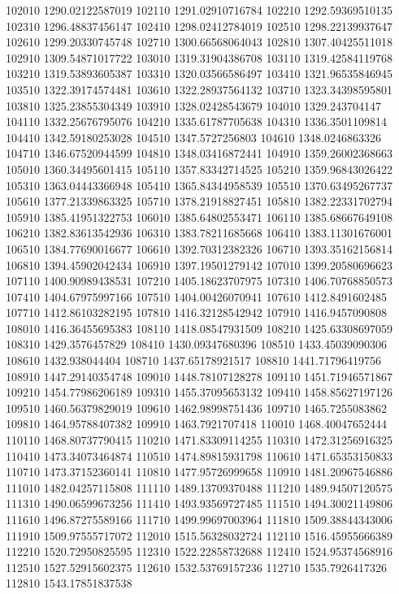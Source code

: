 {102010 1290.02122587019
102110 1291.02910716784
102210 1292.59369510135
102310 1296.48837456147
102410 1298.02412784019
102510 1298.22139937647
102610 1299.20330745748
102710 1300.66568064043
102810 1307.40425511018
102910 1309.54871017722
103010 1319.31904386708
103110 1319.42584119768
103210 1319.53893605387
103310 1320.03566586497
103410 1321.96535846945
103510 1322.39174574481
103610 1322.28937564132
103710 1323.34398595801
103810 1325.23855304349
103910 1328.02428543679
104010 1329.243704147
104110 1332.25676795076
104210 1335.61787705638
104310 1336.3501109814
104410 1342.59180253028
104510 1347.5727256803
104610 1348.0246863326
104710 1346.67520944599
104810 1348.03416872441
104910 1359.26002368663
105010 1360.34495601415
105110 1357.83342714525
105210 1359.96843026422
105310 1363.04443366948
105410 1365.84344958539
105510 1370.63495267737
105610 1377.21339863325
105710 1378.21918827451
105810 1382.22331702794
105910 1385.41951322753
106010 1385.64802553471
106110 1385.68667649108
106210 1382.83613542936
106310 1383.78211685668
106410 1383.11301676001
106510 1384.77690016677
106610 1392.70312382326
106710 1393.35162156814
106810 1394.45902042434
106910 1397.19501279142
107010 1399.20580696623
107110 1400.90989438531
107210 1405.18623707975
107310 1406.70768850573
107410 1404.67975997166
107510 1404.00426070941
107610 1412.8491602485
107710 1412.86103282195
107810 1416.32128542942
107910 1416.9457090808
108010 1416.36455695383
108110 1418.08547931509
108210 1425.63308697059
108310 1429.3576457829
108410 1430.09347680396
108510 1433.45039090306
108610 1432.938044404
108710 1437.65178921517
108810 1441.71796419756
108910 1447.29140354748
109010 1448.78107128278
109110 1451.71946571867
109210 1454.77986206189
109310 1455.37095653132
109410 1458.85627197126
109510 1460.56379829019
109610 1462.98998751436
109710 1465.7255083862
109810 1464.95788407382
109910 1463.7921707418
110010 1468.40047652444
110110 1468.80737790415
110210 1471.83309114255
110310 1472.31256916325
110410 1473.34073464874
110510 1474.89815931798
110610 1471.65353150833
110710 1473.37152360141
110810 1477.95726999658
110910 1481.20967546886
111010 1482.04257115808
111110 1489.13709370488
111210 1489.94507120575
111310 1490.06599673256
111410 1493.93569727485
111510 1494.30021149806
111610 1496.87275589166
111710 1499.99697003964
111810 1509.38844343006
111910 1509.97555717072
112010 1515.56328032724
112110 1516.45955666389
112210 1520.72950825595
112310 1522.22858732688
112410 1524.95374568916
112510 1527.52915602375
112610 1532.53769157236
112710 1535.7926417326
112810 1543.17851837538
}
